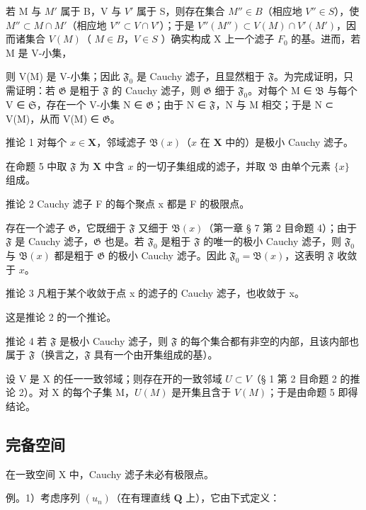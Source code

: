若 M 与 \(M'\) 属于 B，V 与 \(V'\) 属于 S，则存在集合 \(M'' \in B\)（相应地 \(V'' \in S\)），使 \(M'' \subset M \cap M'\)（相应地 \(V'' \subset V \cap V'\)）；于是 \(V''(M'') \subset V(M) \cap V'(M')\)，因而诸集合 \(V(M)\)（ \(M \in B\)，\(V \in S\) ）确实构成 X 上一个滤子 \(F_0\) 的基。进而，若 M 是 V-小集，

则 V(M) 是 V-小集；因此 \(\mathfrak{F}_0\) 是 Cauchy 滤子，且显然粗于 \(\mathfrak{F}\)。为完成证明，只需证明：若 \(\mathfrak{G}\) 是粗于 \(\mathfrak{F}\) 的 Cauchy 滤子，则 \(\mathfrak{G}\) 细于 \(\mathfrak{F}_0\)。对每个 M ∈ \(\mathfrak{B}\) 与每个 V ∈ \(\mathfrak{S}\)，存在一个 V-小集 N ∈ \(\mathfrak{G}\)；由于 N ∈ \(\mathfrak{F}\)，N 与 M 相交；于是 N ⊂ V(M)，从而 V(M) ∈ \(\mathfrak{G}\)。

推论 1 对每个 \(x \in \mathbf{X}\)，邻域滤子 \(\mathfrak{B}(x)\)（\(x\) 在 \(\mathbf{X}\) 中的）是极小 Cauchy 滤子。

在命题 5 中取 \(\mathfrak{F}\) 为 \(\mathbf{X}\) 中含 \(x\) 的一切子集组成的滤子，并取 \(\mathfrak{B}\) 由单个元素 \(\{x\}\) 组成。

推论 2 Cauchy 滤子 F 的每个聚点 x 都是 F 的极限点。

存在一个滤子 \(\mathfrak{G}\)，它既细于 \(\mathfrak{F}\) 又细于 \(\mathfrak{B}(x)\)（第一章 § 7 第 2 目命题 4）；由于 \(\mathfrak{F}\) 是 Cauchy 滤子，\(\mathfrak{G}\) 也是。若 \(\mathfrak{F}_0\) 是粗于 \(\mathfrak{F}\) 的唯一的极小 Cauchy 滤子，则 \(\mathfrak{F}_0\) 与 \(\mathfrak{B}(x)\) 都是粗于 \(\mathfrak{G}\) 的极小 Cauchy 滤子。因此 \(\mathfrak{F}_0 = \mathfrak{B}(x)\)，这表明 \(\mathfrak{F}\) 收敛于 \(x\)。

推论 3 凡粗于某个收敛于点 x 的滤子的 Cauchy 滤子，也收敛于 x。

这是推论 2 的一个推论。

推论 4 若 \(\mathfrak{F}\) 是极小 Cauchy 滤子，则 \(\mathfrak{F}\) 的每个集合都有非空的内部，且该内部也属于 \(\mathfrak{F}\)（换言之，\(\mathfrak{F}\) 具有一个由开集组成的基）。

设 V 是 X 的任一一致邻域；则存在开的一致邻域 \(U \subset V\)（§ 1 第 2 目命题 2 的推论 2）。对 X 的每个子集 M，\(U(M)\) 是开集且含于 \(V(M)\)；于是由命题 5 即得结论。

\subsection{完备空间}

在一致空间 X 中，Cauchy 滤子未必有极限点。

例。1）考虑序列 \((u_{n})\)（在有理直线 \(\mathbf{Q}\) 上），它由下式定义：

